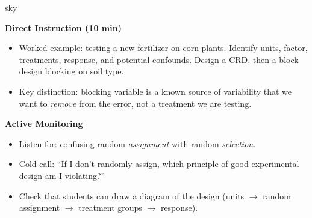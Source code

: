 \documentclass[10pt]{article}
\begin{document}
\begin{skillbox}{sky}
\begin{minipage}[t]{0.48\linewidth}
    \textbf{Direct Instruction (10 min)}
    \begin{itemize}
        \item Worked example: testing a new fertilizer on corn plants. Identify
              units, factor, treatments, response, and potential confounds. Design a
              CRD, then a block design blocking on soil type.
        \item Key distinction: blocking variable is a known source of variability that
              we want to \emph{remove} from the error, not a treatment we are testing.
    \end{itemize}
\end{minipage}
\hfill
\begin{minipage}[t]{0.48\linewidth}
    \textbf{Active Monitoring}
    \begin{itemize}
        \item Listen for: confusing random \emph{assignment} with random \emph{selection}.
        \item Cold-call: ``If I don't randomly assign, which principle of good
              experimental design am I violating?''
        \item Check that students can draw a diagram of the design (units $\to$ random
              assignment $\to$ treatment groups $\to$ response).
    \end{itemize}
\end{minipage}
\end{skillbox}
\end{document}
